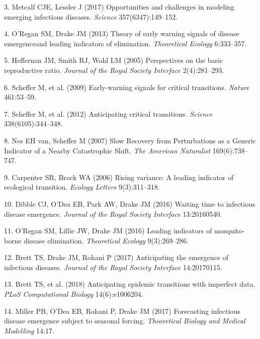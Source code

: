 \documentclass[3p]{elsarticle} %
\begin{document}
\leavevmode\hypertarget{ref-Metcalf2017}{}%
3. Metcalf CJE, Lessler J (2017) Opportunities and challenges in
modeling emerging infectious diseases. \emph{Science}
357(6347):149--152.

\leavevmode\hypertarget{ref-ORegan2013}{}%
4. O'Regan SM, Drake JM (2013) Theory of early warning signals of
disease emergenceand leading indicators of elimination.
\emph{Theoretical Ecology} 6:333--357.

\leavevmode\hypertarget{ref-Heffernan2005}{}%
5. Heffernan JM, Smith RJ, Wahl LM (2005) Perspectives on the basic
reproductive ratio. \emph{Journal of the Royal Society Interface}
2(4):281--293.

\leavevmode\hypertarget{ref-Scheffer2009}{}%
6. Scheffer M, et al. (2009) Early-warning signals for critical
transitions. \emph{Nature} 461:53--59.

\leavevmode\hypertarget{ref-Scheffer2012}{}%
7. Scheffer M, et al. (2012) Anticipating critical transitions.
\emph{Science} 338(6105):344--348.

\leavevmode\hypertarget{ref-VanNes2007}{}%
8. Nes EH van, Scheffer M (2007) Slow Recovery from Perturbations as a
Generic Indicator of a Nearby Catastrophic Shift. \emph{The American
Naturalist} 169(6):738--747.

\leavevmode\hypertarget{ref-Carpenter2006}{}%
9. Carpenter SR, Brock WA (2006) Rising variance: A leading indicator of
ecological transition. \emph{Ecology Letters} 9(3):311--318.

\leavevmode\hypertarget{ref-Dibble2016}{}%
10. Dibble CJ, O'Dea EB, Park AW, Drake JM (2016) Waiting time to
infectious disease emergence. \emph{Journal of the Royal Society
Interface} 13:20160540.

\leavevmode\hypertarget{ref-ORegan2016}{}%
11. O'Regan SM, Lillie JW, Drake JM (2016) Leading indicators of
mosquito-borne disease elimination. \emph{Theoretical Ecology}
9(3):269--286.

\leavevmode\hypertarget{ref-Brett2017}{}%
12. Brett TS, Drake JM, Rohani P (2017) Anticipating the emergence of
infectious diseases. \emph{Journal of the Royal Society Interface}
14:20170115.

\leavevmode\hypertarget{ref-Brett2018}{}%
13. Brett TS, et al. (2018) Anticipating epidemic transitions with
imperfect data. \emph{PLoS Computational Biology} 14(6):e1006204.

\leavevmode\hypertarget{ref-Miller2017}{}%
14. Miller PB, O'Dea EB, Rohani P, Drake JM (2017) Forecasting
infectious disease emergence subject to seasonal forcing.
\emph{Theoretical Biology and Medical Modelling} 14:17.
\end{document}
